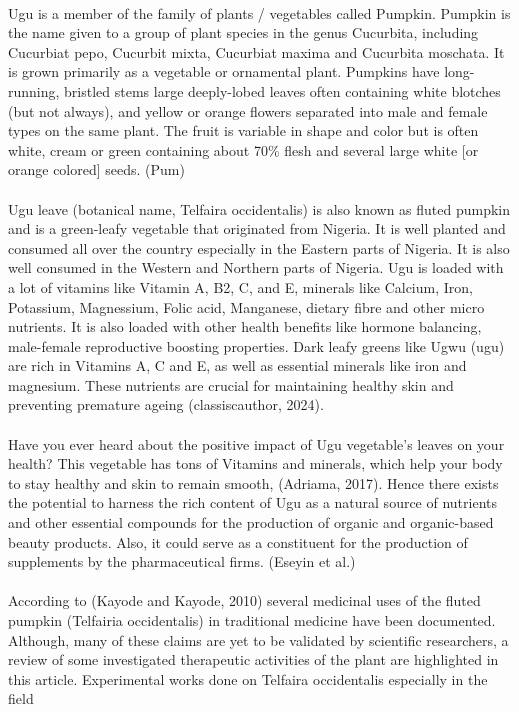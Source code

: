 \paragraph*{}Ugu is a member of the family of plants / vegetables called Pumpkin. Pumpkin is the name given to a group of plant species in the genus Cucurbita, including Cucurbiat pepo, Cucurbit mixta, Cucurbiat maxima and Cucurbita moschata. It is grown primarily as a vegetable or ornamental plant. Pumpkins have long-running, bristled stems large deeply-lobed leaves often containing white blotches (but not always), and yellow or orange flowers separated into male and female types on the same plant. The fruit is  variable in shape and color but is often white, cream or green containing about 70\% flesh and several large white [or orange colored] seeds. (Pum)

\paragraph*{} Ugu leave (botanical name, Telfaira occidentalis) is also known as fluted pumpkin and is a green-leafy vegetable that originated from Nigeria. It is well planted and consumed all over the country especially in the Eastern parts of Nigeria. It is also well consumed in the Western and Northern parts of Nigeria. Ugu is loaded with a lot of vitamins like Vitamin A, B2, C, and E, minerals like Calcium, Iron, Potassium, Magnessium, Folic acid, Manganese, dietary fibre and other micro nutrients. It is also loaded with other health benefits like hormone balancing, male-female reproductive boosting properties. Dark leafy greens like Ugwu (ugu) are rich in Vitamins A, C and E, as well as essential minerals like iron and magnesium. These nutrients are crucial for maintaining healthy skin and preventing premature ageing (classiscauthor, 2024).

\paragraph*{} Have you ever heard about the positive impact of Ugu vegetable's leaves on your health? This vegetable has tons of Vitamins  and minerals, which help your body to stay healthy and skin to remain smooth, (Adriama, 2017). Hence there exists the potential to harness the rich content of Ugu as a natural source of nutrients and other essential compounds for the production of organic and organic-based beauty products. Also, it could serve as a constituent for the production of supplements by the pharmaceutical firms. (Eseyin et al.)

\paragraph*{} According to (Kayode and Kayode, 2010) several medicinal uses of the fluted pumpkin (Telfairia occidentalis) in traditional medicine have been documented. Although, many of these claims are yet to be validated by scientific researchers, a review of some investigated therapeutic activities of the plant are highlighted in this article. Experimental works done on Telfaira occidentalis especially in the field  